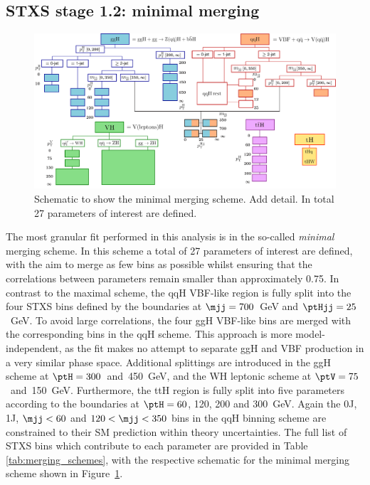 \subsection{STXS stage 1.2: minimal merging}
\begin{figure}[htb!]
  \centering
  \includegraphics[width=.9\linewidth]{Figures/app_merging_schemes/allSTXSbins_minimal.pdf}
  \caption[Schematic of the minimal merging scheme]
  {
    Schematic to show the minimal merging scheme. Add detail. In total 27 parameters of interest are defined.
  }
  \label{fig:minimal_scheme}
\end{figure}

The most granular fit performed in this analysis is in the so-called \textit{minimal} merging scheme. In this scheme a total of 27 parameters of interest are defined, with the aim to merge as few bins as possible whilst ensuring that the correlations between parameters remain smaller than approximately 0.75. In contrast to the maximal scheme, the qqH VBF-like region is fully split into the four STXS bins defined by the boundaries at $\mjj=700$~GeV and $\ptHjj=25$~GeV. To avoid large correlations, the four ggH VBF-like bins are merged with the corresponding bins in the qqH scheme. This approach is more model-independent, as the fit makes no attempt to separate ggH and VBF production in a very similar phase space. Additional splittings are introduced in the ggH scheme at $\ptH=300$~and~450~GeV, and the WH leptonic scheme at $\ptV=75$~and~150~GeV. Furthermore, the ttH region is fully split into five parameters according to the boundaries at $\ptH=60$, 120, 200 and 300~GeV. Again the 0J, 1J, $\mjj<60$ and $120<\mjj<350$ bins in the qqH binning scheme are constrained to their SM prediction within theory uncertainties. The full list of STXS bins which contribute to each parameter are provided in Table \ref{tab:merging_schemes}, with the respective schematic for the minimal merging scheme shown in Figure~\ref{fig:minimal_scheme}.


